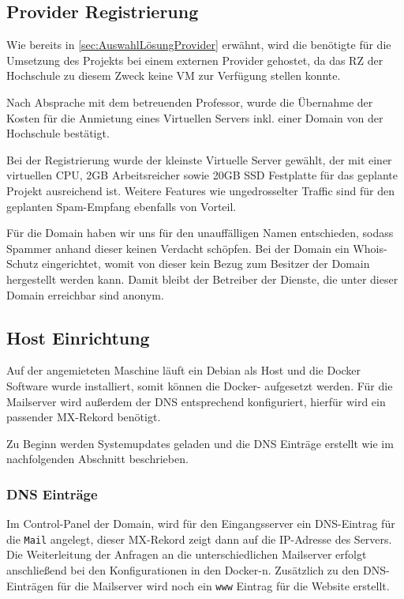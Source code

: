 \documentclass[a4paper,11pt,singlespacing]{article}
\begin{document}
	\subsection{Provider Registrierung}\label{sec:ProviderRegistrierung} 
		Wie bereits in \autoref{sec:AuswahlLösungProvider} erwähnt, wird die benötigte  für die Umsetzung des Projekts bei einem externen Provider gehostet, da das RZ der Hochschule zu diesem Zweck keine VM zur Verfügung stellen konnte.
		
		Nach Absprache mit dem betreuenden Professor, wurde die Übernahme der Kosten für die Anmietung eines Virtuellen Servers inkl. einer Domain von der Hochschule bestätigt.  
		
		Bei der Registrierung wurde der kleinste Virtuelle Server gewählt, der mit einer virtuellen CPU, 2GB Arbeitsreicher sowie 20GB SSD Festplatte für das geplante Projekt ausreichend ist. Weitere Features wie ungedrosselter Traffic sind für den geplanten Spam-Empfang ebenfalls von Vorteil.
		
		Für die Domain haben wir uns für den unauffälligen Namen entschieden, sodass Spammer anhand dieser keinen Verdacht schöpfen. Bei der Domain ein Whois-Schutz eingerichtet, womit von dieser kein Bezug zum Besitzer der Domain hergestellt werden kann. Damit bleibt der Betreiber der Dienste, die unter dieser Domain erreichbar sind anonym.
		
		
	\subsection{Host Einrichtung}\label{sec:UmsetzungHostEinrichtung}
		Auf der angemieteten Maschine läuft ein Debian als Host und die Docker Software wurde installiert, somit können die Docker- aufgesetzt werden. Für die Mailserver wird au{\ss}erdem der DNS entsprechend konfiguriert, hierfür wird ein passender MX-Rekord benötigt.
		
		Zu Beginn werden Systemupdates geladen und die DNS Einträge erstellt wie im nachfolgenden Abschnitt beschrieben.
		
		\subsubsection{DNS Einträge}\label{sec:DNSEinträge}
			Im Control-Panel der Domain, wird für den Eingangsserver ein DNS-Eintrag für die \texttt{Mail} angelegt, dieser MX-Rekord zeigt dann auf die IP-Adresse des Servers. Die Weiterleitung der Anfragen an die unterschiedlichen Mailserver erfolgt anschlie{\ss}end bei den Konfigurationen in den  Docker-n.
			Zusätzlich zu den DNS-Einträgen für die Mailserver wird noch ein \texttt{www} Eintrag für die Website erstellt.
\end{document}
